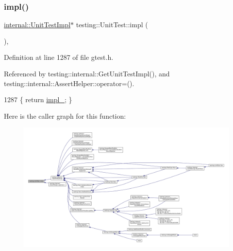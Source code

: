 \mbox{\label{classtesting_1_1UnitTest_a4df5d11a58affb337d7fa62eaa07690e}} 
\subsubsection{\texorpdfstring{impl()}{impl()}\hspace{0.1cm}{\footnotesize\ttfamily [1/2]}}
{\footnotesize\ttfamily \hyperlink{classtesting_1_1internal_1_1UnitTestImpl}{internal\+::\+Unit\+Test\+Impl}$\ast$ testing\+::\+Unit\+Test\+::impl (\begin{DoxyParamCaption}{ }\end{DoxyParamCaption})\hspace{0.3cm}{\ttfamily [inline]}, {\ttfamily [private]}}



Definition at line 1287 of file gtest.\+h.



Referenced by testing\+::internal\+::\+Get\+Unit\+Test\+Impl(), and testing\+::internal\+::\+Assert\+Helper\+::operator=().


\begin{DoxyCode}
1287 \{ \textcolor{keywordflow}{return} \hyperlink{classtesting_1_1UnitTest_a834685f92009d21b21a7307f4cbfb6e5}{impl\_}; \}
\end{DoxyCode}
Here is the caller graph for this function\+:
\nopagebreak
\begin{figure}[H]
\begin{center}
\leavevmode
\includegraphics[width=350pt]{classtesting_1_1UnitTest_a4df5d11a58affb337d7fa62eaa07690e_icgraph}
\end{center}
\end{figure}
\mbox{\label{classtesting_1_1UnitTest_a266a9f49070d1959c1c9d649423879b4}} 
